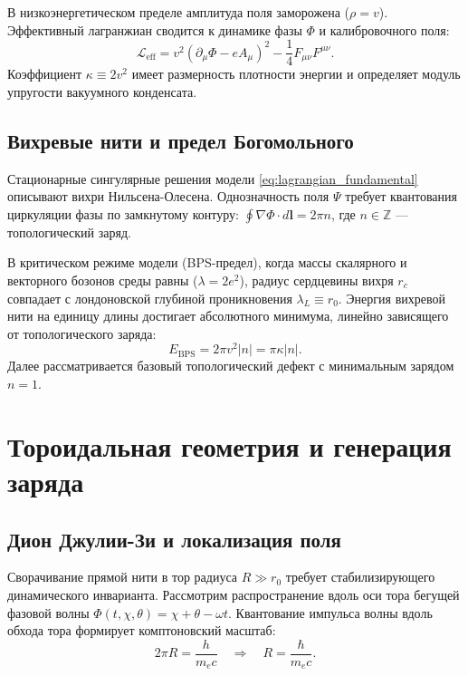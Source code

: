 \documentclass[12pt,a4paper]{article}
\begin{document}
В низкоэнергетическом пределе амплитуда поля заморожена ($\rho = v$). Эффективный лагранжиан сводится к динамике фазы $\Phi$ и калибровочного поля:
\begin{equation}
\mathcal{L}_{\text{eff}} = v^2 (\partial_\mu \Phi - e A_\mu)^2 - \frac{1}{4} F_{\mu\nu} F^{\mu\nu}.
\label{eq:lagrangian_eff}
\end{equation}
Коэффициент $\kappa \equiv 2v^2$ имеет размерность плотности энергии и определяет модуль упругости вакуумного конденсата.

\subsection{Вихревые нити и предел Богомольного}
Стационарные сингулярные решения модели \eqref{eq:lagrangian_fundamental} описывают вихри Нильсена-Олесена. Однозначность поля $\Psi$ требует квантования циркуляции фазы по замкнутому контуру: $\oint \nabla \Phi \cdot d\mathbf{l} = 2\pi n$, где $n \in \mathbb{Z}$ — топологический заряд.

В критическом режиме модели (BPS-предел), когда массы скалярного и векторного бозонов среды равны ($\lambda = 2e^2$), радиус сердцевины вихря $r_c$ совпадает с лондоновской глубиной проникновения $\lambda_L \equiv r_0$. Энергия вихревой нити на единицу длины достигает абсолютного минимума, линейно зависящего от топологического заряда:
\begin{equation}
E_{\text{BPS}} = 2\pi v^2 |n| = \pi \kappa |n|.
\label{eq:energy_bps}
\end{equation}
Далее рассматривается базовый топологический дефект с минимальным зарядом $n=1$.

\section{Тороидальная геометрия и генерация заряда}

\subsection{Дион Джулии-Зи и локализация поля}
Сворачивание прямой нити в тор радиуса $R \gg r_0$ требует стабилизирующего динамического инварианта. Рассмотрим распространение вдоль оси тора бегущей фазовой волны $\Phi(t, \chi, \theta) = \chi + \theta - \omega t$.
Квантование импульса волны вдоль обхода тора формирует комптоновский масштаб:
\begin{equation}
2\pi R = \frac{h}{m_e c} \quad \Longrightarrow \quad R = \frac{\hbar}{m_e c}.
\label{eq:compton_radius}
\end{equation}
\end{document}
